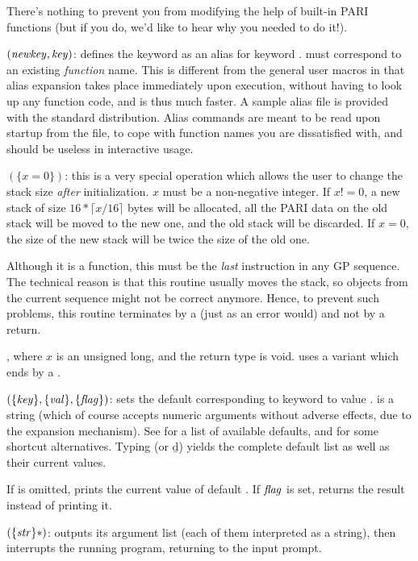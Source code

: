 There's nothing to prevent you from modifying the help of built-in PARI
functions (but if you do, we'd like to hear why you needed to do it!).

$(\hbox{\it newkey\/},\hbox{\it key\/})$: defines the keyword
 as an alias for keyword .  must correspond
to an existing \emph{function} name. This is different from the general user
macros in that alias expansion takes place immediately upon execution,
without having to look up any function code, and is thus much faster. A
sample alias file  is provided with the standard
distribution. Alias commands are meant to be read upon startup from the
 file, to cope with function names you are dissatisfied with, and
should be useless in interactive usage.

$(\{x=0\})$: this is a very special operation which
allows the user to change the stack size \emph{after} initialization. $x$
must be a non-negative integer. If $x!=0$, a new stack of size $16*\lceil
x/16\rceil$ bytes will be allocated, all the PARI data on the old stack will
be moved to the new one, and the old stack will be discarded. If $x=0$, the
size of the new stack will be twice the size of the old one.

Although it is a function, this must be the \emph{last} instruction in any GP
sequence. The technical reason is that this routine usually moves the stack,
so objects from the current sequence might not be correct anymore. Hence, to
prevent such problems, this routine terminates by a  (just as an
error would) and not by a return.

, where $x$ is an unsigned long, and the return type
is void.  uses a variant which ends by a .

$(\{\hbox{\it key\/}\},\{\hbox{\it val\/}\},\{\hbox{\it f\kern0pt lag\/}\})$: sets the default
corresponding to keyword  to value .  is a string
(which of course accepts numeric arguments without adverse effects, due to the
expansion mechanism). See  for a list of available
defaults, and  for some shortcut alternatives. Typing
 (or \b{d}) yields the complete default list as well as
their current values.\label{se:default}

If  is omitted, prints the current value of default .
If $\hbox{\it f\kern0pt lag\/}$ is set, returns the result instead of printing it.

$(\{\hbox{\it str\/}\}*)$: outputs its argument list (each of
them interpreted as a string), then interrupts the running  program,
returning to the input prompt.

